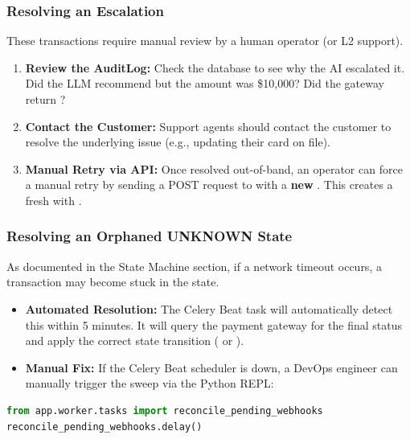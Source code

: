 \subsubsection{Resolving an Escalation}
These transactions require manual review by a human operator (or L2 support).
\begin{enumerate}
    \item \textbf{Review the AuditLog:} Check the database to see why the AI escalated it. Did the LLM recommend  but the amount was \$10,000? Did the gateway return ?
    \item \textbf{Contact the Customer:} Support agents should contact the customer to resolve the underlying issue (e.g., updating their card on file).
    \item \textbf{Manual Retry via API:} Once resolved out-of-band, an operator can force a manual retry by sending a POST request to  with a \textbf{new} . This creates a fresh  with .
\end{enumerate}

\vspace{0.4cm}

\subsubsection{Resolving an Orphaned UNKNOWN State}
As documented in the State Machine section, if a network timeout occurs, a transaction may become stuck in the  state. 
\begin{itemize}
    \item \textbf{Automated Resolution:} The  Celery Beat task will automatically detect this within 5 minutes. It will query the payment gateway for the final status and apply the correct state transition ( or ).
    \item \textbf{Manual Fix:} If the Celery Beat scheduler is down, a DevOps engineer can manually trigger the sweep via the Python REPL:
\end{itemize}

\begin{tcolorbox}[codebox={Manual Sweep Trigger}]
\begin{lstlisting}[language=Python]
from app.worker.tasks import reconcile_pending_webhooks
reconcile_pending_webhooks.delay()
\end{lstlisting}
\end{tcolorbox}

